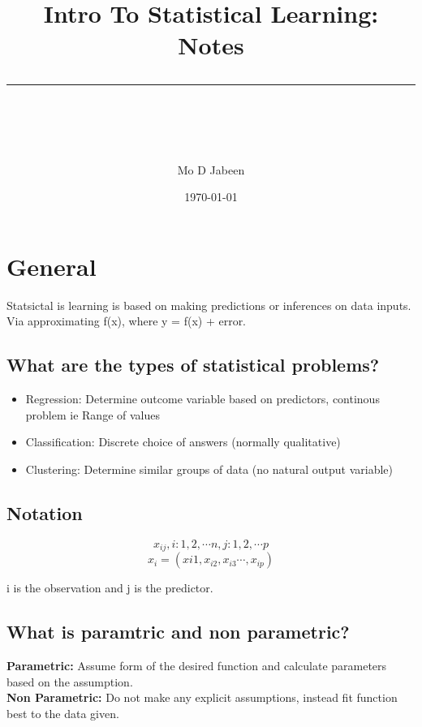 \documentclass[11pt]{scrartcl} %
\title{	
	\normalfont\normalsize
	\vspace{20pt} %
	{\huge Intro To Statistical Learning: Notes}\\ %
	\vspace{12pt} %
	\rule{\linewidth}{2pt}\\ %
}
\author{\small Mo D Jabeen} %
\date{\normalsize\today} %
\begin{document}
\maketitle %

\section{General}

Statsictal is learning is based on making predictions or inferences on data inputs. Via approximating f(x),
where y = f(x) + error.

\subsection{What are the types of statistical problems?}

\begin{itemize}
	\item Regression: Determine outcome variable based on predictors, continous problem ie Range of values 
	\item Classification: Discrete choice of answers (normally qualitative)
	\item Clustering: Determine similar groups of data (no natural output variable)
\end{itemize}

\subsection{Notation}

\begin{equation}
	x_{ij}, i:1,2,\cdots n, j:1,2,\cdots p
\end{equation}
\begin{equation}
	x_{i} = (x{i1},x_{i2},x_{i3} \cdots,x_{ip})
\end{equation}

i is the observation and j is the predictor.

\subsection{What is paramtric and non parametric?}

\textbf{Parametric:} Assume form of the desired function and calculate parameters based on the assumption.\\

\textbf{Non Parametric:} Do not make any explicit assumptions, instead fit function best to the data given.\\
\end{document}

